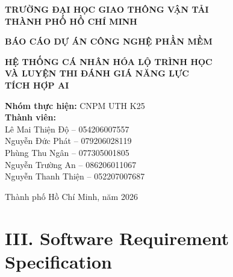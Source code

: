 \documentclass[12pt,a4paper,oneside]{report}
\begin{document}
\begin{titlepage}
  \thispagestyle{empty}
  \begin{center}
    \textbf{TRƯỜNG ĐẠI HỌC GIAO THÔNG VẬN TẢI}\\
    \textbf{THÀNH PHỐ HỒ CHÍ MINH}

    \vspace{1.2cm}

    \textbf{BÁO CÁO DỰ ÁN CÔNG NGHỆ PHẦN MỀM}

    \vfill

    {\Large
      \textbf{HỆ THỐNG CÁ NHÂN HÓA LỘ TRÌNH HỌC}\\
      \textbf{VÀ LUYỆN THI ĐÁNH GIÁ NĂNG LỰC}\\
      \textbf{TÍCH HỢP AI}
    }

    \vspace{2cm}

    \begin{flushleft}
      \textbf{Nhóm thực hiện:} CNPM UTH K25\\[0.3cm]
      \textbf{Thành viên:}\\
      Lê Mai Thiện Độ -- 054206007557\\
      Nguyễn Đức Phát -- 079206028119\\
      Phùng Thu Ngân -- 077305001805\\
      Nguyễn Trường An -- 086206011067\\
      Nguyễn Thanh Thiện -- 052207007687
    \end{flushleft}

    \vfill
    Thành phố Hồ Chí Minh, năm 2026
  \end{center}
\end{titlepage}

\begingroup
\small
\sloppy
\tableofcontents
\endgroup
\clearpage
{}





\chapter*{III. Software Requirement Specification}
\end{document}
